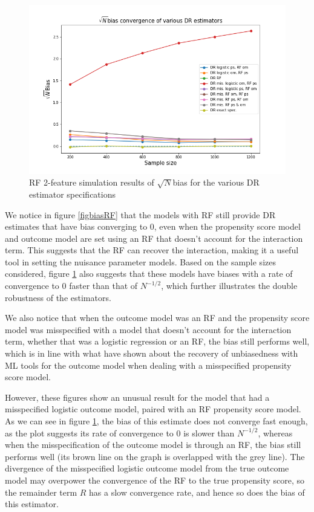 \documentclass[12pt,twoside]{article}
\begin{document}
\begin{figure} 
    \centering
    \includegraphics[width = 0.9\columnwidth]{figures/sqrtnRF.png}
    \caption{RF 2-feature simulation results of $\sqrt{N}$bias for the various DR estimator specifications}
    \label{figsqrtnRF}
\end{figure}

We notice in figure \ref{figbiasRF} that the models with RF still provide DR estimates that have bias converging to 0, even when the propensity score model and outcome model are set using an RF that doesn't account for the interaction term. This suggests that the RF can recover the interaction, making it a useful tool in setting the nuisance parameter models. Based on the sample sizes considered, figure \ref{figsqrtnRF} also suggests that these models have biases with a rate of convergence to 0 faster than that of $N^{-1/2}$, which further illustrates the double robustness of the estimators.

We also notice that when the outcome model was an RF and the propensity score model was misspecified with a model that doesn't account for the interaction term, whether that was a logistic regression or an RF, the bias still performs well, which is in line with what \citet{ps_SL} have shown about the recovery of unbiasedness with ML tools for the outcome model when dealing with a misspecified propensity score model. 

However, these figures show an unusual result for the model that had a misspecified logistic outcome model, paired with an RF propensity score model. As we can see in figure \ref{figsqrtnRF}, the bias of this estimate does not converge fast enough, as the plot suggests its rate of convergence to 0 is slower than $N^{-1/2}$, whereas when the misspecification of the outcome model is through an RF, the bias still performs well (its brown line on the graph is overlapped with the grey line). The divergence of the misspecified logistic outcome model from the true outcome model may overpower the convergence of the RF to the true propensity score, so the \cite{benkeser2017} remainder term $R$ has a slow convergence rate, and hence so does the bias of this estimator.
\end{document}

